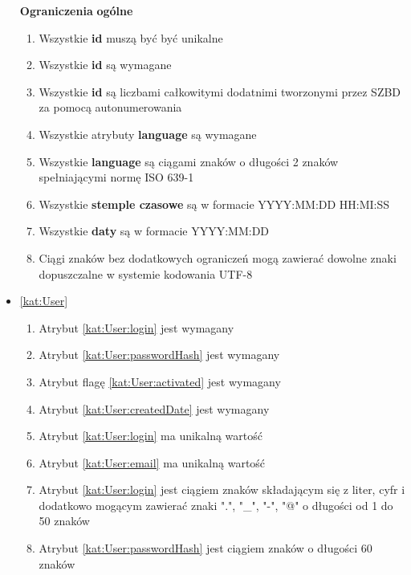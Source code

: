\begin{itemize}[label={\textbf{Ograniczenia dla}}, wide, labelwidth=!, labelindent=0pt]
    \setlength\itemsep{1em}
    \item[\textbf{Ograniczenia}] \textbf{ogólne}
    \begin{enumerate}[label={\textbf{OGR/\protect\threedigits{\arabic{enumi}}}}, wide, labelwidth=!, align=left, leftmargin=3cm]
        \item Wszystkie \textbf{id} muszą być być unikalne
        \item Wszystkie \textbf{id} są wymagane
        \item Wszystkie \textbf{id} są liczbami całkowitymi dodatnimi tworzonymi przez SZBD za pomocą autonumerowania
        \item Wszystkie atrybuty \textbf{language} są wymagane
        \item Wszystkie \textbf{language} są ciągami znaków o długości 2 znaków spełniającymi normę ISO 639-1
        \item Wszystkie \textbf{stemple czasowe} są w formacie YYYY:MM:DD HH:MI:SS
        \item Wszystkie \textbf{daty} są w formacie YYYY:MM:DD
        \item Ciągi znaków bez dodatkowych ograniczeń mogą zawierać dowolne znaki dopuszczalne w systemie kodowania UTF-8
    \end{enumerate}
    \item\ref{kat:User}
    \begin{enumerate}[label={\textbf{OGR/\protect\threedigits{\arabic{enumi}}}}, wide, labelwidth=!, align=left, leftmargin=3cm, resume]
        \item Atrybut \ref{kat:User:login} jest wymagany
        \item Atrybut \ref{kat:User:passwordHash} jest wymagany
        \item Atrybut flagę \ref{kat:User:activated} jest wymagany
        \item Atrybut \ref{kat:User:createdDate} jest wymagany
        \item Atrybut \ref{kat:User:login} ma unikalną wartość
        \item Atrybut \ref{kat:User:email} ma unikalną wartość
        \item Atrybut \ref{kat:User:login} jest ciągiem znaków składającym się z liter, cyfr i dodatkowo mogącym zawierać znaki ".", "\_", "-", "@" o długości od 1 do 50 znaków
        \item Atrybut \ref{kat:User:passwordHash} jest ciągiem znaków o długości 60 znaków

\end{enumerate}
\end{itemize}
